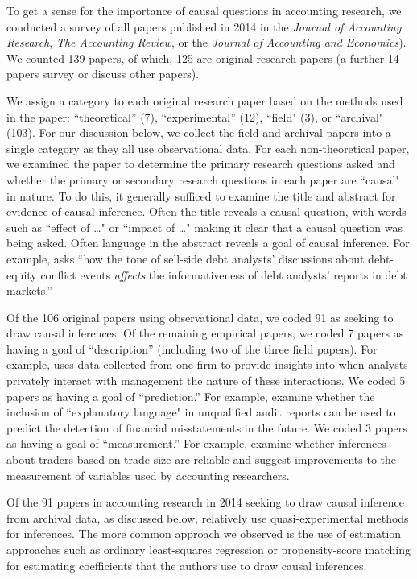 \documentclass[11pt,reqno]{amsart}
\begin{document}
\begin{doublespace}
To get a sense for the importance of causal questions in accounting research,
we conducted a survey of all papers published in 2014 in the  \textit{Journal of Accounting Research}, \textit{The Accounting Review}, or the \textit{Journal of Accounting and Economics}).
We counted 139 papers, of which, 125 are original research papers (a further 14 papers survey or discuss other papers).

We assign a category to each original research paper based on the methods used in the paper: ``theoretical''  (7), ``experimental'' (12), ``field" (3), or ``archival"  (103). 
For our discussion below, we collect the field and archival papers into a single category as they all use observational data.
For each non-theoretical paper, we examined the paper to determine the primary research questions asked and whether the primary or secondary research questions in each paper are
``causal" in nature.
To do this, it generally sufficed to examine the title and abstract for evidence of causal inference. 
Often the title reveals a causal question, with words such as  ``effect of \dots" or ``impact of \dots"  
\citep[e.g.][]{Cohen:2014jl,Clorproell:2014cv} making it clear that a causal question was being asked. 
Often language in the abstract reveals a goal of causal inference. 
For example, \citet{deFranco:2014ct} asks ``how the tone of sell-side debt analysts' discussions about debt-equity conflict events \emph{affects} the informativeness of debt analysts’ reports in debt markets.''

Of the 106 original papers using observational data, we coded 91 as seeking to draw causal inferences.
Of the remaining empirical papers, we coded 7 papers as having a goal of ``description'' (including two of the three field papers). 
For example, \citet{Soltes:2013ba} uses data collected from one firm to provide insights into when analysts privately interact with management the nature of these interactions.
We coded 5 papers as having a goal of ``prediction.'' 
For example, \citet{Czerney:2014bv} examine whether the inclusion of ``explanatory language" in unqualified audit reports can be used to predict the detection of financial misstatements in the future.
We coded 3 papers as having a goal of ``measurement.'' 
For example, \citet{Cready:2014ji} examine whether inferences about traders based on trade size are reliable and suggest improvements to the measurement of variables used by accounting researchers.

Of the 91 papers in accounting research in 2014 seeking to draw causal inference from archival data, as discussed below, relatively use quasi-experimental methods for inferences.
The more common approach we observed is the use of estimation approaches such as ordinary least-squares regression or propensity-score matching for estimating coefficients that the authors use to draw causal inferences.



\end{doublespace}
\end{document}
